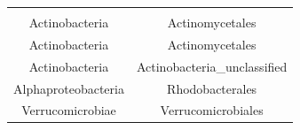 \documentclass[]{article}
\begin{document}
\begin{longtable}[]{@{}cc@{}}
\begin{minipage}[t]{0.38\columnwidth}
\end{minipage}\tabularnewline
\begin{minipage}[t]{0.29\columnwidth}\centering\strut
Actinobacteria\strut
\end{minipage} & \begin{minipage}[t]{0.38\columnwidth}\centering\strut
Actinomycetales\strut
\end{minipage}\tabularnewline
\begin{minipage}[t]{0.29\columnwidth}\centering\strut
Actinobacteria\strut
\end{minipage} & \begin{minipage}[t]{0.38\columnwidth}\centering\strut
Actinomycetales\strut
\end{minipage}\tabularnewline
\begin{minipage}[t]{0.29\columnwidth}\centering\strut
Actinobacteria\strut
\end{minipage} & \begin{minipage}[t]{0.38\columnwidth}\centering\strut
Actinobacteria\_unclassified\strut
\end{minipage}\tabularnewline
\begin{minipage}[t]{0.29\columnwidth}\centering\strut
Alphaproteobacteria\strut
\end{minipage} & \begin{minipage}[t]{0.38\columnwidth}\centering\strut
Rhodobacterales\strut
\end{minipage}\tabularnewline
\begin{minipage}[t]{0.29\columnwidth}\centering\strut
Verrucomicrobiae\strut
\end{minipage} & \begin{minipage}[t]{0.38\columnwidth}\centering\strut
Verrucomicrobiales\strut
\end{minipage}\tabularnewline
\bottomrule
\end{longtable}
\end{document}
